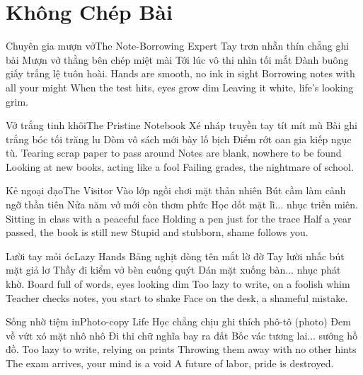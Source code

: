 \chapter{Không Chép Bài}

\begin{tutuyetbox}{Chuyên gia mượn vở}{The Note-Borrowing Expert}
Tay trơn nhẵn thín chẳng ghi bài
Mượn vở thằng bên chép miệt mài
Tới lúc vô thi nhìn tối mắt
Đành buông giấy trắng lệ tuôn hoài.
\tcblower
Hands are smooth, no ink in sight 
Borrowing notes with all your might 
When the test hits, eyes grow dim 
Leaving it white, life's looking grim.
\end{tutuyetbox}

\begin{tutuyetbox}{Vở trắng tinh khôi}{The Pristine Notebook}
Xé nháp truyền tay tít mít mù
Bài ghi trắng bóc tối trăng lu
Dòm vô sách mới bày lố bịch
Điểm rớt oan gia kiếp ngục tù.
\tcblower
Tearing scrap paper to pass around 
Notes are blank, nowhere to be found 
Looking at new books, acting like a fool 
Failing grades, the nightmare of school.
\end{tutuyetbox}

\begin{tutuyetbox}{Kẻ ngoại đạo}{The Visitor}
Vào lớp ngồi chơi mặt thản nhiên
Bút cầm làm cảnh ngỡ thần tiên
Nửa năm vở mới còn thơm phức
Học dốt mặt lì... nhục triền miên.
\tcblower
Sitting in class with a peaceful face
Holding a pen just for the trace
Half a year passed, the book is still new
Stupid and stubborn, shame follows you.
\end{tutuyetbox}

\begin{tutuyetbox}{Lười tay mỏi óc}{Lazy Hands}
Bảng nghịt dòng tên mắt lờ đờ
Tay lười nhấc bút mặt giả lơ
Thầy đi kiểm vở bèn cuống quýt
Dán mặt xuống bàn... nhục phát khờ.
\tcblower
Board full of words, eyes looking dim
Too lazy to write, on a foolish whim
Teacher checks notes, you start to shake
Face on the desk, a shameful mistake.
\end{tutuyetbox}

\begin{tutuyetbox}{Sống nhờ tiệm in}{Photo-copy Life}
Học chẳng chịu ghi thích phô-tô (photo)
Đem về vứt xó mặt nhô nhô
Đi thi chữ nghĩa bay ra đất
Bốc vác tương lai... sướng hồ đồ.
\tcblower
Too lazy to write, relying on prints
Throwing them away with no other hints
The exam arrives, your mind is a void
A future of labor, pride is destroyed.
\end{tutuyetbox}

